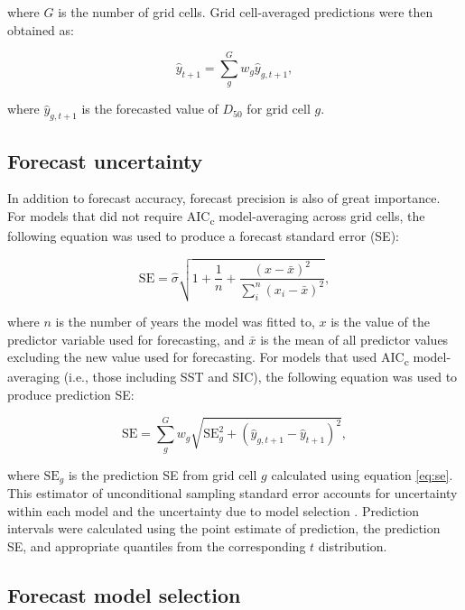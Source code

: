 \documentclass[12pt,]{book}
\theoremstyle{definition}
\theoremstyle{definition}
\theoremstyle{definition}
\theoremstyle{remark}
\begin{document}
\noindent
where \(G\) is the number of grid cells. Grid cell-averaged predictions
were then obtained as:

\begin{equation}
  \hat{y}_{t+1}=\sum_g^G w_g \hat{y}_{g,t+1},
\label{eq:grid-avg-fcst}
\end{equation}

\noindent
where \(\hat{y}_{g,t+1}\) is the forecasted value of \(D_{50}\) for grid
cell \(g\).

\subsection{Forecast uncertainty}\label{forecast-uncertainty}

\noindent
In addition to forecast accuracy, forecast precision is also of great
importance. For models that did not require AIC\textsubscript{c}
model-averaging across grid cells, the following equation was used to
produce a forecast standard error (SE):

\begin{equation}
  \text{SE}=\hat{\sigma} \sqrt{1 + \frac{1}{n} + \frac{(x-\bar{x})^2}{\sum_i^n(x_i-\bar{x})^2}},
\label{eq:se}
\end{equation}

\noindent
where \(n\) is the number of years the model was fitted to, \(x\) is the
value of the predictor variable used for forecasting, and \(\bar{x}\) is
the mean of all predictor values excluding the new value used for
forecasting. For models that used AIC\textsubscript{c} model-averaging
(i.e., those including SST and SIC), the following equation was used to
produce prediction SE:

\begin{equation}
  \text{SE}=\sum_g^G w_g \sqrt{\text{SE}_g^2+(\hat{y}_{g,t+1}-\hat{y}_{t+1})^2},
\label{eq:mod-avg-se}
\end{equation}

\noindent
where \(\text{SE}_g\) is the prediction SE from grid cell \(g\)
calculated using equation \eqref{eq:se}. This estimator of unconditional
sampling standard error accounts for uncertainty within each model and
the uncertainty due to model selection \citep{burnham-anderson-2002}.
Prediction intervals were calculated using the point estimate of
prediction, the prediction SE, and appropriate quantiles from the
corresponding \(t\) distribution.

\subsection{Forecast model selection}\label{model-selection}
\end{document}

